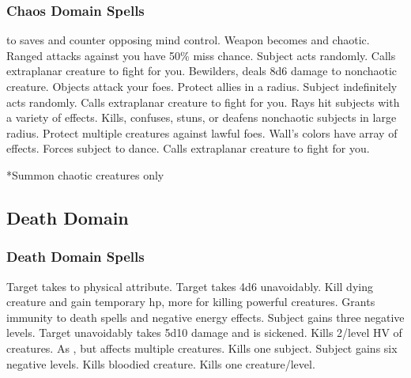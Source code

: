\subsubsection{Chaos Domain Spells}
\begin{spelllist}
  \spellhead[1]{}
    to saves and counter opposing mind control.
   Weapon becomes  and chaotic.
   Ranged attacks against you have 50\% miss chance.
   Subject acts randomly.
   Calls extraplanar creature to fight for you.
   Bewilders, deals 8d6 damage to nonchaotic creature.
   Objects attack your foes.
   Protect allies in a \areamed radius.
   Subject indefinitely acts randomly.
   Calls extraplanar creature to fight for you.
   Rays hit subjects with a variety of effects.
   Kills, confuses, stuns, or deafens nonchaotic subjects in large radius.
  \F Protect multiple creatures against lawful foes. 
   Wall's colors have array of effects.
   Forces subject to dance.
   Calls extraplanar creature to fight for you.
\end{spelllist}
*Summon chaotic creatures only

\subsection{Death Domain}
\subsubsection{Death Domain Spells}
\begin{spelllist}
   Target takes  to physical attribute.
  \spellhead[1]{}
   Target takes 4d6 unavoidably.
   Kill dying creature and gain temporary hp, more for killing powerful creatures.
   Grants immunity to death spells and negative energy effects.
  \spellhead[3]{}
  \spellhead[4]{}
   Subject gains three negative levels.
   Target unavoidably takes 5d10 damage and is sickened.
  \spellhead[5]{}
  \M Kills 2/level HV of creatures.
  \spellhead[6]{} 
   As , but affects multiple creatures.
   Kills one subject.
   Subject gains six negative levels.
  \spellhead[8]{}
   Kills bloodied creature.
   Kills one creature/level.
\end{spelllist}

